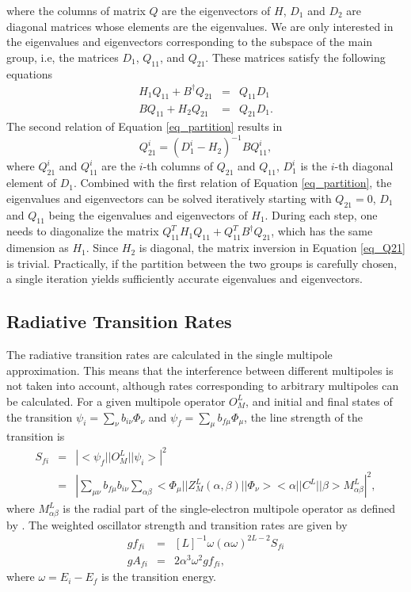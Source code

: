 \documentclass{elsart}
\begin{document}
where the columns of matrix $Q$ are the eigenvectors of $H$, $D_1$ and $D_2$
are diagonal matrices whose elements are the eigenvalues. We are only
interested in the eigenvalues and eigenvectors corresponding to the subspace
of the main group, i.e, the matrices $D_1$, $Q_{11}$, and $Q_{21}$. These
matrices satisfy the following equations
\begin{eqnarray}
\label{eq_partition}
H_1 Q_{11} + B^{\dagger}Q_{21} &=&  Q_{11} D_1 \nonumber \\
B Q_{11} + H_2 Q_{21} &=& Q_{21} D_1 .
\end{eqnarray}
The second relation of Equation \ref{eq_partition} results in 
\begin{equation}
\label{eq_Q21}
Q_{21}^{i} = (D_1^{i} - H_2)^{-1}B Q_{11}^{i},
\end{equation}
where $Q_{21}^{i}$ and $Q_{11}^{i}$ are the $i$-th columns of $Q_{21}$ and
$Q_{11}$, $D_1^{i}$ is the $i$-th diagonal element of $D_1$. Combined with the
first relation of Equation \ref{eq_partition}, the eigenvalues and
eigenvectors can 
be solved iteratively starting with $Q_{21} = 0$, $D_1$ and $Q_{11}$ being the
eigenvalues and eigenvectors of $H_1$. During each step, one needs to
diagonalize the matrix $Q_{11}^{T} H_1 Q_{11} + Q_{11}^{T}B^{\dagger}Q_{21}$,
which 
has the same dimension as $H_1$. Since $H_2$ is diagonal, the matrix
inversion in Equation \ref{eq_Q21} is trivial. Practically, if the partition
between the two groups is carefully chosen, a single iteration yields
sufficiently accurate eigenvalues and eigenvectors.

\subsection{Radiative Transition Rates}
The radiative transition rates are calculated in the single multipole
approximation. This means that the interference between different multipoles
is not taken into account, although rates corresponding to arbitrary
multipoles can be calculated. For a given multipole operator $O^L_M$, and
initial and final states of 
the transition $\psi_i = \sum_\nu b_{i\nu}\Phi_\nu$ and $\psi_f = \sum_\mu
b_{f\mu}\Phi_\mu$, the line strength of the transition is 
\begin{eqnarray}
S_{fi} &=& \left|<\psi_f||O^L_M||\psi_i>\right|^2 \nonumber\\
&=& \left|\sum_{\mu\nu}b_{f\mu}b_{i\nu}\sum_{\alpha\beta}
<\Phi_\mu||Z^L_M(\alpha,\beta)||\Phi_\nu><\alpha||C^L||\beta>
M^L_{\alpha\beta}\right|^2 ,
\end{eqnarray} 
where $M^L_{\alpha\beta}$ is the radial part of the single-electron multipole
operator as defined by \citet{grant74}.
The weighted oscillator strength and transition rates are given by 
\begin{eqnarray}
gf_{fi} &=& [L]^{-1}\omega(\alpha\omega)^{2L-2} S_{fi} \\
gA_{fi} &=& 2\alpha^3 \omega^2 gf_{fi},
\end{eqnarray}
where $\omega = E_i - E_f$ is the transition energy. 
\end{document}
